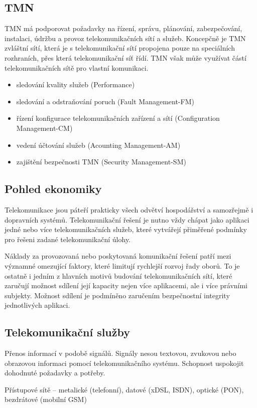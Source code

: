 \subsection{TMN}
TMN má podporovat požadavky na řízení, správu, plánování, zabezpečování, instalaci, údržbu a provoz telekomunikačních sítí a služeb. Koncepčně je TMN zvláštní sítí, která je s telekomunikační sítí propojena pouze na speciálních rozhraních, přes která telekomunikační síť řídí. TMN však může využívat částí telekomunikačních sítě pro vlastní komunikaci.
\begin{itemize}
    \item sledování kvality služeb (Performance)
    \item sledování a odstraňování poruch (Fault Management-FM)
    \item řízení konfigurace telekomunikačních zařízení a sítí (Configuration Management-CM)
    \item vedení účtování služeb (Acounting Management-AM)
    \item zajištění bezpečnosti TMN (Security Management-SM)
\end{itemize}

\subsection{Pohled ekonomiky}
Telekomunikace jsou páteří prakticky všech odvětví hospodářství a samozřejmě i dopravních systémů. Telekomunikační řešení je nutno vždy chápat jako aplikaci jedné nebo více telekomunikačních služeb, které vytvářejí přiměřené podmínky pro řešeni zadané telekomunikační úlohy. 

Náklady za provozovaná nebo poskytovaná komunikační řešení patří mezi významné omezující faktory, které limitují rychlejší rozvoj řady oborů. To je ostatně i jedním z hlavních motivů budování telekomunikačních sítí, které zaručují možnost sdílení její kapacity nejen více aplikacemi, ale i více právními subjekty. Možnost sdílení je podmíněno zaručením bezpečnostní integrity jednotlivých aplikaci.

\subsection{Telekomunikační služby}
Přenos informací v podobě signálů. Signály nesou textovou, zvukovou nebo obrazovou informaci pomocí telekomunikačního systému. Schopnost uspokojit dohodnuté požadavky a potřeby. 

Přístupové sítě -- metalické (telefonní), datové (xDSL, ISDN), optické (PON), bezdrátové (mobilní GSM)


